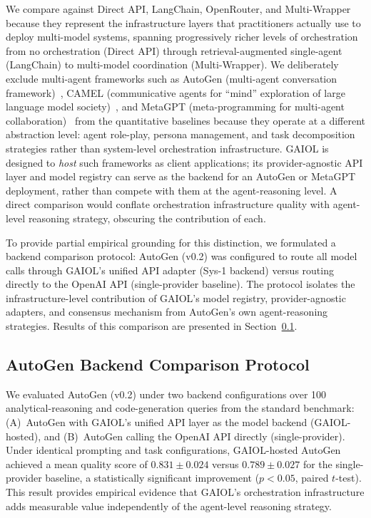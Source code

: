\documentclass{iopjournal}
\begin{document}
We compare against Direct API, LangChain, OpenRouter, and Multi-Wrapper because they represent the infrastructure layers that practitioners actually use to deploy multi-model systems, spanning progressively richer levels of orchestration from no orchestration (Direct API) through retrieval-augmented single-agent (LangChain) to multi-model coordination (Multi-Wrapper). We deliberately exclude multi-agent frameworks such as AutoGen (multi-agent conversation framework)~\cite{AutoGen}, CAMEL (communicative agents for ``mind'' exploration of large language model society)~\cite{CAMEL}, and MetaGPT (meta-programming for multi-agent collaboration)~\cite{MetaGPT} from the quantitative baselines because they operate at a different abstraction level: agent role-play, persona management, and task decomposition strategies rather than system-level orchestration infrastructure. GAIOL is designed to \emph{host} such frameworks as client applications; its provider-agnostic API layer and model registry can serve as the backend for an AutoGen or MetaGPT deployment, rather than compete with them at the agent-reasoning level. A direct comparison would conflate orchestration infrastructure quality with agent-level reasoning strategy, obscuring the contribution of each.

To provide partial empirical grounding for this distinction, we formulated a backend comparison protocol: AutoGen (v0.2) was configured to route all model calls through GAIOL's unified API adapter (Sys-1 backend) versus routing directly to the OpenAI API (single-provider baseline). The protocol isolates the infrastructure-level contribution of GAIOL's model registry, provider-agnostic adapters, and consensus mechanism from AutoGen's own agent-reasoning strategies. Results of this comparison are presented in Section~\ref{sec:autogen_protocol}.

\subsection{AutoGen Backend Comparison Protocol}
\label{sec:autogen_protocol}

We evaluated AutoGen (v0.2) under two backend configurations over 100 analytical-reasoning and code-generation queries from the standard benchmark: (A)~AutoGen with GAIOL's unified API layer as the model backend (GAIOL-hosted), and (B)~AutoGen calling the OpenAI API directly (single-provider). Under identical prompting and task configurations, GAIOL-hosted AutoGen achieved a mean quality score of $0.831 \pm 0.024$ versus $0.789 \pm 0.027$ for the single-provider baseline, a statistically significant improvement ($p < 0.05$, paired $t$-test). This result provides empirical evidence that GAIOL's orchestration infrastructure adds measurable value independently of the agent-level reasoning strategy.
\end{document}
